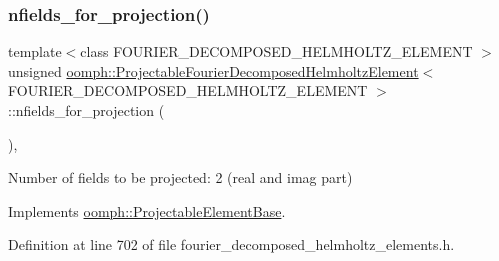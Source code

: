 \subsubsection{\texorpdfstring{nfields\+\_\+for\+\_\+projection()}{nfields\_for\_projection()}}
{\footnotesize\ttfamily template$<$class F\+O\+U\+R\+I\+E\+R\+\_\+\+D\+E\+C\+O\+M\+P\+O\+S\+E\+D\+\_\+\+H\+E\+L\+M\+H\+O\+L\+T\+Z\+\_\+\+E\+L\+E\+M\+E\+NT $>$ \\
unsigned \hyperlink{classoomph_1_1ProjectableFourierDecomposedHelmholtzElement}{oomph\+::\+Projectable\+Fourier\+Decomposed\+Helmholtz\+Element}$<$ F\+O\+U\+R\+I\+E\+R\+\_\+\+D\+E\+C\+O\+M\+P\+O\+S\+E\+D\+\_\+\+H\+E\+L\+M\+H\+O\+L\+T\+Z\+\_\+\+E\+L\+E\+M\+E\+NT $>$\+::nfields\+\_\+for\+\_\+projection (\begin{DoxyParamCaption}{ }\end{DoxyParamCaption})\hspace{0.3cm}{\ttfamily [inline]}, {\ttfamily [virtual]}}



Number of fields to be projected\+: 2 (real and imag part) 



Implements \hyperlink{classoomph_1_1ProjectableElementBase_a44634aa4049332a580d249c25564638c}{oomph\+::\+Projectable\+Element\+Base}.



Definition at line 702 of file fourier\+\_\+decomposed\+\_\+helmholtz\+\_\+elements.\+h.

\mbox{\label{classoomph_1_1ProjectableFourierDecomposedHelmholtzElement_ab1f9e43fe32a5c09fefe61f324a650cc}} 
